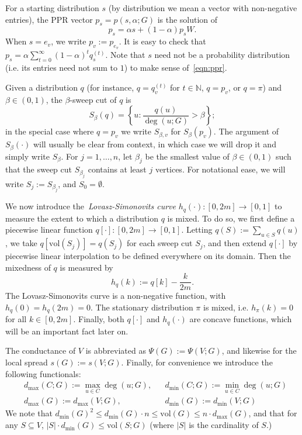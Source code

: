 \documentclass{article}
\newcommand{\set}[1]{\left\{#1\right\}}
\newcommand{\vol}{\mathrm{vol}}
\newcommand{\1}{\mathbf{1}}
\theoremstyle{definition}
\theoremstyle{remark}
\begin{document}
For a starting distribution $s$ (by distribution we mean a vector with non-negative entries), the PPR vector $p_s = p(s,\alpha;G)$ is the solution of
\begin{equation}
\label{eqn:ppr}
p_s = \alpha s + (1 - \alpha) p_s W.
\end{equation}
When $s = e_v$, we write $p_v := p_{e_v}$. It is easy to check that $p_s = \alpha \sum_{t = 0}^{\infty} (1 - \alpha)^t q_s^{(t)}$.  Note that $s$ need not be a probability distribution (i.e. its entries need not sum to $1$) to make sense of~\eqref{eqn:ppr}.

Given a distribution $q$ (for instance, $q = q_v^{(t)}$ for $t \in \mathbb{N}$, $q = p_v$, or $q = \pi$) and $\beta \in (0,1)$, the $\beta$-sweep cut of $q$ is
\begin{equation*}
S_{\beta}(q) = \set{u: \frac{q(u)}{\deg(u;G)} > \beta};
\end{equation*} 
in the special case where $q = p_v$ we write $S_{\beta,v}$ for $S_{\beta}(p_v)$. The argument of $S_{\beta}(\cdot)$ will usually be clear from context, in which case we will drop it and simply write $S_{\beta}$. For $j = 1,\ldots,n$, let $\beta_j$ be the smallest value of $\beta \in (0,1)$ such that the sweep cut $S_{\beta_j}$ contains at least $j$ vertices. For notational ease, we will write $S_j := S_{\beta_j}$, and $S_0 = \emptyset$. 

We now introduce the~\emph{Lovasz-Simonovits curve} $h_q(\cdot): [0,2m] \to [0,1]$ to measure the extent to which a distribution $q$ is mixed. To do so, we first define a piecewise linear function $q[\cdot]: [0,2m] \to [0,1]$. Letting $q(S) := \sum_{u \in S} q(u)$, we take $q[\vol(S_j)] = q(S_j)$ for each sweep cut $S_j$, and then extend $q[\cdot]$ by piecewise linear interpolation to be defined everywhere on its domain. Then the mixedness of $q$ is measured by
\begin{equation*}
h_q(k) := q[k] - \frac{k}{2m}.
\end{equation*}
The Lovasz-Simonovits curve is a non-negative function, with $h_q(0) = h_q(2m) = 0$. The stationary distribution $\pi$ is mixed, i.e. $h_{\pi}(k) = 0$ for all $k \in [0,2m]$. Finally, both $q[\cdot]$ and $h_q(\cdot)$ are concave functions, which will be an important fact later on.  

The conductance of $V$ is abbreviated as $\Psi(G) := \Psi(V;G)$, and likewise for the local spread $s(G) := s(V;G)$. Finally, for convenience we introduce the following functionals:
\begin{equation*}
\begin{aligned}
& d_{\max}(C; G) := \max_{u \in C} \deg(u; G), && d_{\min}(C; G) := \min_{u \in C} \deg(u;G) \\
& d_{\max}(G) := d_{\max}(V;G),~~ && d_{\min}(G) := d_{\min}(V; G)
\end{aligned}
\end{equation*}
We note that $d_{\min}(G)^2 \leq d_{\min}(G) \cdot n \leq \vol(G) \leq n \cdot d_{\max}(G)$, and that for any $S \subseteq V$, $|S| \cdot d_{\min}(G) \leq \vol(S;G)$ (where $|S|$ is the cardinality of $S$.)
\end{document}
